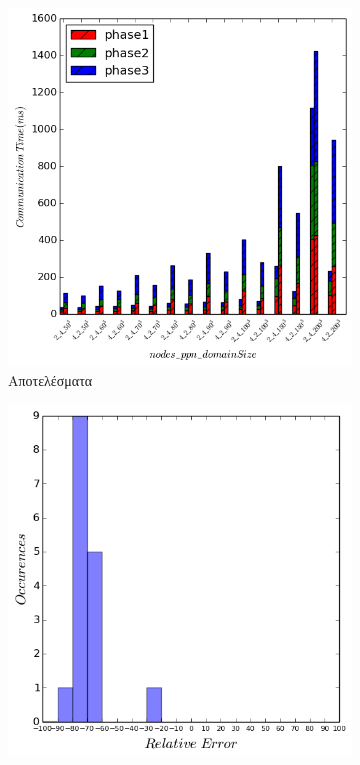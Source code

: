 \begin{figure}
    \centering
    \captionsetup{justification=centering,margin=0cm,font=footnotesize}
    \begin{subfigure}[b]{0.47\textwidth}
        \includegraphics[width=\textwidth]{./images/NB_NUMA/lulesh_res_nfe.png}
        \caption{Αποτελέσματα}
    \end{subfigure}
    \quad %
    \begin{subfigure}[b]{0.47\textwidth}
        \includegraphics[width=\textwidth]{./images/NB_NUMA/lulesh_err_dist_nfe.png}

\end{subfigure}
\end{figure}
